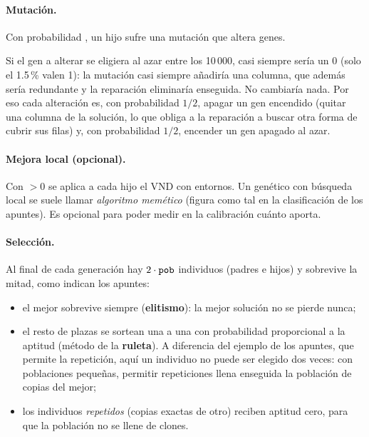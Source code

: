 \paragraph{Mutación.} Con probabilidad , un hijo sufre una mutación que altera
 genes.

\begin{decision}
Si el gen a alterar se eligiera al azar entre los 10\,000, casi siempre sería un 0 (solo el
1.5\,\% valen 1): la mutación casi siempre añadiría una columna, que además sería redundante
y la reparación eliminaría enseguida. No cambiaría nada. Por eso cada alteración es, con
probabilidad $1/2$, apagar un gen encendido (quitar una columna de la solución, lo que
obliga a la reparación a buscar otra forma de cubrir sus filas) y, con probabilidad $1/2$,
encender un gen apagado al azar.
\end{decision}

\paragraph{Mejora local (opcional).} Con  $>0$ se aplica a cada hijo el VND con
 entornos. Un genético con búsqueda local se suele llamar \emph{algoritmo memético}
(figura como tal en la clasificación de los apuntes). Es opcional para poder medir en la
calibración cuánto aporta.

\paragraph{Selección.} Al final de cada generación hay $2\cdot\texttt{pob}$ individuos (padres e
hijos) y sobrevive la mitad, como indican los apuntes:
\begin{itemize}
  \item el mejor sobrevive siempre (\textbf{elitismo}): la mejor solución no se pierde nunca;
  \item el resto de plazas se sortean una a una con probabilidad proporcional a la aptitud
        (método de la \textbf{ruleta}). A diferencia del ejemplo de los apuntes, que permite
        la repetición, aquí un individuo no puede ser elegido dos veces: con poblaciones
        pequeñas, permitir repeticiones llena enseguida la población de copias del mejor;
  \item los individuos \emph{repetidos} (copias exactas de otro) reciben aptitud cero, para
        que la población no se llene de clones.
\end{itemize}

